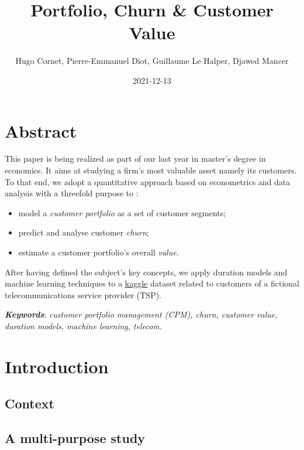 \documentclass[
]{book}
\title{Portfolio, Churn \& Customer Value}
\author{Hugo Cornet, Pierre-Emmanuel Diot, Guillaume Le Halper, Djawed Mancer}
\date{2021-12-13}
\providecommand{\tightlist}{%
  \setlength{\itemsep}{0pt}\setlength{\parskip}{0pt}}
\begin{document}
\maketitle

{
\setcounter{tocdepth}{1}
\tableofcontents
}
\hypertarget{abstract}{%
\chapter*{Abstract}\label{abstract}}

This paper is being realized as part of our last year in master's degree in economics. It aims at studying a firm's most valuable asset namely its customers. To that end, we adopt a quantitative approach based on econometrics and data analysis with a threefold purpose to :

\begin{itemize}
\tightlist
\item
  model a \emph{customer portfolio} as a set of customer segments;
\item
  predict and analyse customer \emph{churn};
\item
  estimate a customer portfolio's overall \emph{value}.
\end{itemize}

After having defined the subject's key concepts, we apply duration models and machine learning techniques to a \href{https://www.kaggle.com/yeanzc/telco-customer-churn-ibm-dataset}{kaggle} dataset related to customers of a fictional telecommunications service provider (TSP).

\textbf{\emph{Keywords}}: \emph{customer portfolio management (CPM), churn, customer value, duration models, machine learning, telecom.}

\hypertarget{intro}{%
\chapter{Introduction}\label{intro}}

\hypertarget{context}{%
\section{Context}\label{context}}

\hypertarget{a-multi-purpose-study}{%
\section{A multi-purpose study}\label{a-multi-purpose-study}}
\end{document}

